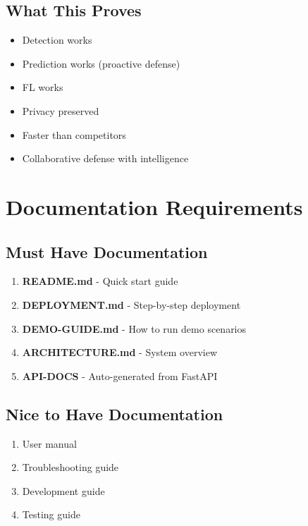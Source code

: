 \documentclass[11pt,a4paper]{article}
\begin{document}
\subsection{What This Proves}

\begin{itemize}[leftmargin=*]
    \item Detection works
    \item Prediction works (proactive defense)
    \item FL works
    \item Privacy preserved
    \item Faster than competitors
    \item Collaborative defense with intelligence
\end{itemize}

\section{Documentation Requirements}

\subsection{Must Have Documentation}

\begin{enumerate}[leftmargin=*]
    \item \textbf{README.md} - Quick start guide
    \item \textbf{DEPLOYMENT.md} - Step-by-step deployment
    \item \textbf{DEMO-GUIDE.md} - How to run demo scenarios
    \item \textbf{ARCHITECTURE.md} - System overview
    \item \textbf{API-DOCS} - Auto-generated from FastAPI
\end{enumerate}

\subsection{Nice to Have Documentation}

\begin{enumerate}[leftmargin=*]
    \item User manual
    \item Troubleshooting guide
    \item Development guide
    \item Testing guide
\end{enumerate}
\end{document}
